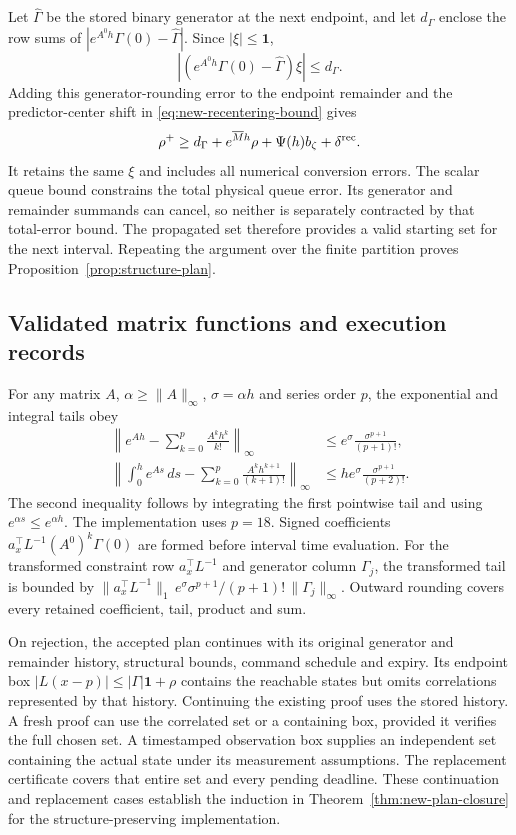\documentclass[preprint,12pt]{elsarticle}
\begin{document}
Let $\widehat\Gamma$ be the stored binary generator at the next endpoint,
and let $d_\Gamma$ enclose the row sums of
$|e^{A^0h}\Gamma(0)-\widehat\Gamma|$. Since $|\xi|\le\mathbf1$,
\[
 |(e^{A^0h}\Gamma(0)-\widehat\Gamma)\xi|\le d_\Gamma.
\]
Adding this generator-rounding error to the endpoint remainder and the
predictor-center shift in \eqref{eq:new-recentering-bound} gives
\begin{equation}
 \rho^+\ge d_\Gamma+e^{\overline{M}h}\rho+\Psi(h)b_\zeta+\delta^{\rm rec}.
 \label{eq:structure-endpoint-update}
\end{equation}
It retains the same $\xi$ and includes all numerical conversion errors.
The scalar queue bound constrains the total physical queue error. Its
generator and remainder summands can cancel, so neither is separately
contracted by that total-error bound. The propagated set therefore
provides a valid starting set for the next interval. Repeating the
argument over the finite partition proves
Proposition~\ref{prop:structure-plan}.

\subsection{Validated matrix functions and execution records}

For any matrix $A$, $\alpha\ge\|A\|_\infty$, $\sigma=\alpha h$ and series order
$p$, the exponential and integral tails obey
\begin{equation}
 \begin{aligned}
 \left\|e^{Ah}-\sum_{k=0}^p\frac{A^kh^k}{k!}\right\|_\infty
       &\le e^\sigma\frac{\sigma^{p+1}}{(p+1)!},\\
 \left\|\int_0^h e^{As}\,ds-
          \sum_{k=0}^p\frac{A^kh^{k+1}}{(k+1)!}\right\|_\infty
       &\le he^\sigma\frac{\sigma^{p+1}}{(p+2)!}.
 \end{aligned}
 \label{eq:structure-matrix-tails}
\end{equation}
The second inequality follows by integrating the first pointwise tail and
using $e^{\alpha s}\le e^{\alpha h}$. The implementation uses $p=18$.
Signed coefficients $a_x^\top L^{-1}(A^0)^k\Gamma(0)$ are formed before
interval time evaluation. For the transformed constraint row $a_x^\top L^{-1}$ and generator column $\Gamma_j$,
the transformed tail is bounded by
$\|a_x^\top L^{-1}\|_1\,e^\sigma \sigma^{p+1}/(p+1)!\,\|\Gamma_j\|_\infty$.
Outward rounding covers every retained coefficient, tail, product and sum.

On rejection, the accepted plan continues with its original generator and
remainder history, structural bounds, command schedule and expiry. Its
endpoint box $|L(x-p)|\le |\Gamma|\mathbf1+\rho$ contains the reachable
states but omits correlations represented by that history. Continuing the
existing proof uses the stored history. A fresh proof can use the correlated
set or a containing box, provided it verifies the full chosen set. A
timestamped observation box supplies an independent set containing the
actual state under its measurement assumptions. The replacement certificate
covers that entire set and every pending deadline. These continuation and
replacement cases establish the induction in
Theorem~\ref{thm:new-plan-closure} for the structure-preserving implementation.
\end{document}
